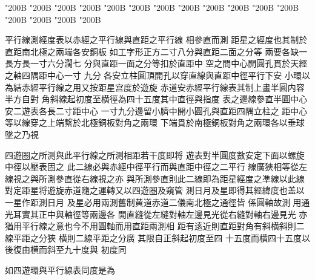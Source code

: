 \begin{正文}
\char"200B\relax{}
\char"200B\relax{}
\char"200B\relax{}
\char"200B\relax{}
\char"200B\relax{}
\char"200B\relax{}
\char"200B\relax{}
\char"200B\relax{}
\char"200B\relax{}
\char"200B\relax{}
\char"200B\relax{}
\char"200B\relax{}
\char"200B\relax{}
\char"200B\relax{}
\char"200B\relax{}
\char"200B\relax
{}\par
平行線測經度表以赤經之平行線與直距之平行線
相參直而測
距星之經度也其制於直距南北極之兩端各安銅板
如工字形正方二寸八分與直距二面之分等
兩要各缺一長方長一寸六分濶七
分與直距一面之分等扣於直距中
空之間中心開圓孔貫於天經之軸四隅距中心一寸
九分
各安立柱圓頂開孔以穿直線與直距中徑平行下安
小環以為結赤經平行線之用又按距星宫度於遊旋
赤道安赤經平行線表其制上畫半圓内容半方自對
角斜線起初度至横徑為四十五度其中直徑與指度
表之邊線參直半圓中心安二遊表各長二寸距中心
一寸九分邊留小臍中開小圓孔與直距四隅立柱之
距中心等以線穿之上端繫於北極銅板對角之兩環
下端貫於南極銅板對角之兩環各以垂球墜之乃視
\par
四遊圏之所測與此平行線之所測相距若干度即将
遊表對半圓度數安定下面以螺旋中徑以壓表固之
此二線必與赤經中徑平行而與直距中徑之二平行
線廣狹相等從左線視之與所測參直從右線視之亦
與所測參直則此二線即為距星經度之凖線以此線
對定距星将遊旋赤道隨之運轉又以四遊圏及窺管
測日月及星即得其經緯度也盖以一星作距測日月
及星必用兩測舊制黄道赤道二儀南北極之通徑皆
係圓軸故測𠉀用通光耳實其正中與軸徑等兩邊各
開直縫從左縫對軸左邊見光從右縫對軸右邊見光
亦猶用平行線之意也今不用圓軸而用直距兩測相
距有逺近則直距對角有斜横斜則二線平距之分狹
横則二線平距之分廣
其限自正斜起初度至四
十五度而横四十五度以後復由横而斜至九十度與
初度同
\par
如四遊環與平行線表同度是為

\end{正文}
